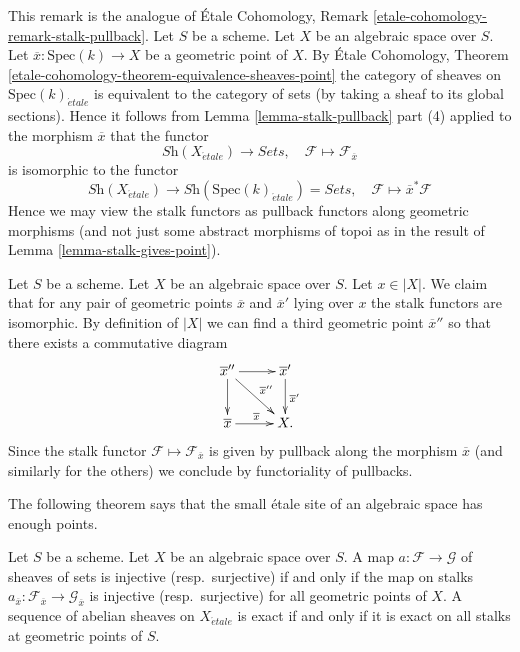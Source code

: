 \begin{remark}
\label{remark-stalk-pullback}
This remark is the analogue of
\'Etale Cohomology, Remark \ref{etale-cohomology-remark-stalk-pullback}.
Let $S$ be a scheme.
Let $X$ be an algebraic space over $S$.
Let $\overline{x} : \text{Spec}(k) \to X$ be a geometric point of $X$.
By
\'Etale Cohomology,
Theorem \ref{etale-cohomology-theorem-equivalence-sheaves-point}
the category of sheaves on $\text{Spec}(k)_{\acute{e}tale}$ is
equivalent to the category of sets (by taking a sheaf to its global sections).
Hence it follows from
Lemma \ref{lemma-stalk-pullback} part (4)
applied to the morphism $\overline{x}$ that the functor
$$
\textit{Sh}(X_{\acute{e}tale}) \longrightarrow \textit{Sets},\quad
\mathcal{F} \longmapsto \mathcal{F}_{\overline{x}}
$$
is isomorphic to the functor
$$
\textit{Sh}(X_{\acute{e}tale})
\longrightarrow
\textit{Sh}(\text{Spec}(k)_{\acute{e}tale}) = \textit{Sets},
\quad
\mathcal{F} \longmapsto \overline{x}^*\mathcal{F}
$$
Hence we may view the stalk functors as pullback functors along
geometric morphisms (and not just some abstract morphisms of topoi
as in the result of
Lemma \ref{lemma-stalk-gives-point}).
\end{remark}

\begin{remark}
\label{remark-map-stalks}
Let $S$ be a scheme.
Let $X$ be an algebraic space over $S$.
Let $x \in |X|$.
We claim that for any pair of geometric points $\overline{x}$ and
$\overline{x}'$ lying over $x$ the stalk functors are isomorphic.
By definition of $|X|$ we can find a third geometric point
$\overline{x}''$ so that there exists a commutative diagram
$$
\xymatrix{
\overline{x}'' \ar[r] \ar[d] \ar[rd]^{\overline{x}''} &
\overline{x}' \ar[d]^{\overline{x}'} \\
\overline{x} \ar[r]^{\overline{x}} & X.
}
$$
Since the stalk functor $\mathcal{F} \mapsto \mathcal{F}_{\overline{x}}$
is given by pullback along the morphism $\overline{x}$ (and similarly for
the others) we conclude by functoriality of pullbacks.
\end{remark}




\noindent
The following theorem says that the small \'etale site of an algebraic
space has enough points.

\begin{theorem}
\label{theorem-exactness-stalks}
Let $S$ be a scheme. Let $X$ be an algebraic space over $S$.
A map $a : \mathcal{F} \to \mathcal{G}$ of sheaves of sets is injective
(resp.\ surjective) if and only if the map on stalks
$a_{\overline{x}} : \mathcal{F}_{\overline{x}} \to \mathcal{G}_{\overline{x}}$
is injective (resp.\ surjective) for all geometric points of $X$.
A sequence of abelian sheaves on $X_{\acute{e}tale}$ is exact
if and only if it is exact on all stalks at geometric points of $S$.
\end{theorem}

